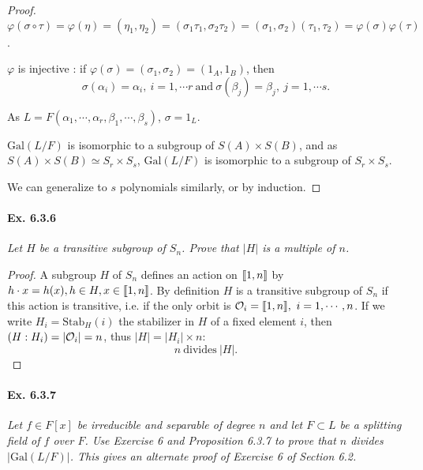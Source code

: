 \documentclass[11pt,a4paper]{article}
\def\gcro{\mbox{[\hspace{-.15em}[}}%
\def\dcro{\mbox{]\hspace{-.15em}]}}
\newcommand{\Gal}{\mathrm{Gal}}
\begin{document}
\begin{proof}
$\varphi(\sigma \circ \tau) = \varphi(\eta) = (\eta_1,\eta_2) = (\sigma_1  \tau_1, \sigma_2  \tau_2) = (\sigma_1, \sigma_2) (\tau_1,\tau_2) =  \varphi(\sigma)\varphi(\tau)$.

$\varphi$ is injective : if $\varphi(\sigma) = (\sigma_1,\sigma_2) = (1_A,1_B)$, then $$\sigma(\alpha_i) = \alpha_i,\ i=1,\cdots r \ \mathrm{and}\ \sigma(\beta_j) = \beta_j,\ j=1,\cdots s.$$

As $L=F(\alpha_1,\cdots,\alpha_{r}, \beta_1,\cdots,\beta_{s})$, $\sigma = 1_L$.

 $\Gal(L/F)$ is isomorphic to a subgroup of $S(A) \times S(B)$, and as $S(A)\times S(B) \simeq S_r\times S_s$,  $\Gal(L/F)$ is isomorphic to a subgroup of $S_r\times S_s$.

We can generalize to $s$ polynomials similarly, or by induction.
\end{proof}

\paragraph{Ex. 6.3.6}

{\it Let $H$ be a transitive subgroup of $S_n$. Prove that $|H|$ is a multiple of $n$.
}

\begin{proof}
A subgroup $H$ of $S_n$ defines an action on $\gcro 1,n \dcro$ by $h\cdot x = h(x), h\in H, x \in \gcro 1,n \dcro$. By definition $H$ is a transitive subgroup of $S_n$ if this action is transitive, i.e. if the only orbit is ${\cal O}_i =\gcro 1,n \dcro,\ i=1,\cdots,n$.
If we write $H_i = \mathrm{Stab}_H(i)$ the stabilizer in  $H$ of a fixed element $i$, then $(H:H_i) = \vert {\cal O}_i \vert =n$, thus $\vert H \vert = \vert H_i \vert \times n$:
$$n \ \mathrm{divides} \  \vert H \vert.$$
\end{proof}

\paragraph{Ex. 6.3.7}

{\it Let $f \in F[x]$ be irreducible and separable of degree $n$ and let $F\subset L$ be a splitting field of $f$ over $F$. Use Exercise 6 and Proposition 6.3.7 to prove that $n$ divides $|\Gal(L/F) |$. This gives an alternate proof of Exercise 6 of Section 6.2.
}
\end{document}
